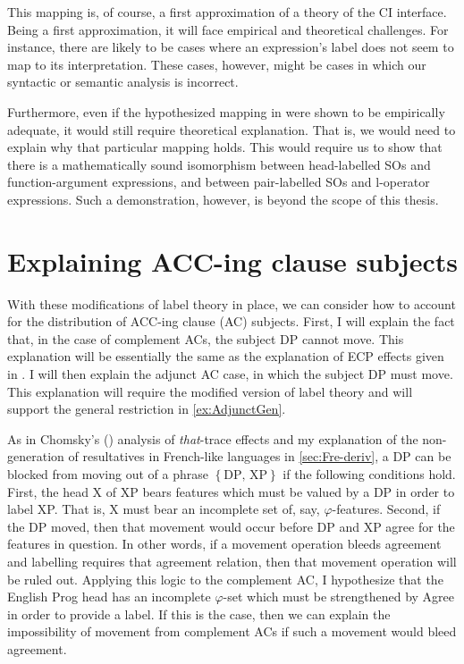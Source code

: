 \documentclass[MilwayThesis]{subfiles}
\begin{document}
This mapping is, of course, a first approximation of a theory of the CI interface.
Being a first approximation, it will face empirical and theoretical challenges.
For instance, there are likely to be cases where an expression's label does not seem to map to its interpretation.
These cases, however, might be cases in which our syntactic or semantic analysis is incorrect.

Furthermore, even if the hypothesized mapping in \Last were shown to be empirically adequate, it would still require theoretical explanation.
That is, we would need to explain why that particular mapping holds.
This would require us to show that there is a mathematically sound isomorphism between head-labelled SOs and function-argument expressions, and between pair-labelled SOs and l-operator expressions.
Such a demonstration, however, is beyond the scope of this thesis.
\section{Explaining ACC-ing clause subjects}\label{sec:ExplainingACCingSubjs}
With these modifications of label theory in place, we can consider how to account for the distribution of ACC-ing clause (AC) subjects.
First, I will explain the fact that, in the case of complement ACs, the subject DP cannot move.
This explanation will be essentially the same as the explanation of ECP effects given in \cite{chomsky2015problems}.
I will then explain the adjunct AC case, in which the subject DP must move.
This explanation will require the modified version of label theory and will support the general restriction in \cref{ex:AdjunctGen}.

As in Chomsky's (\citeyear{chomsky2015problems}) analysis of \textit{that}-trace effects and my explanation of the non-generation of resultatives in French-like languages in \cref{sec:Fre-deriv}, a DP can be blocked from moving out of a phrase $\left\{ \text{DP, XP} \right\}$ if the following conditions hold.
First, the head X of XP bears features which must be valued by a DP in order to label XP.
That is, X must bear an incomplete set of, say, $\varphi$-features.
Second, if the DP moved, then that movement would occur before DP and XP agree for the features in question.
In other words, if a movement operation bleeds agreement and labelling requires that agreement relation, then that movement operation will be ruled out.
Applying this logic to the complement AC, I hypothesize that the English Prog head has an incomplete $\varphi$-set which must be strengthened by Agree in order to provide a label.
If this is the case, then we can explain the impossibility of movement from complement ACs if such a movement would bleed agreement.
\end{document}
